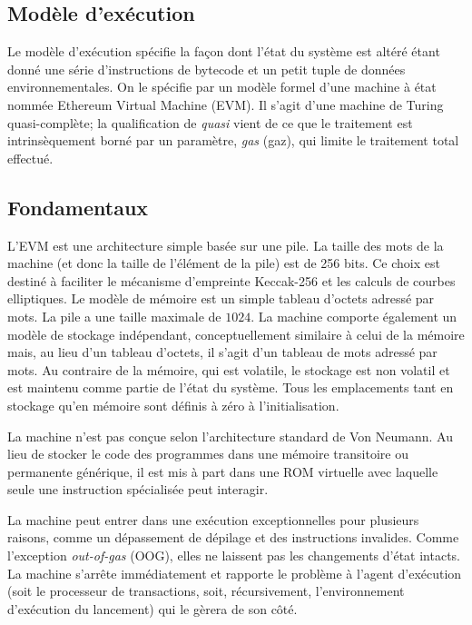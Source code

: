\documentclass[9pt,oneside]{amsart}
\begin{document}
\begin{multicols}{2}
\section{Modèle d'exécution} \label{ch:model}

Le modèle d'exécution spécifie la façon dont l'état du système est altéré étant donné une série d'instructions de bytecode et un petit tuple de données environnementales. On le spécifie par un modèle formel d'une machine à état nommée Ethereum Virtual Machine (EVM). Il s'agit d'une machine de Turing quasi-complète; la qualification de \textit{quasi} vient de ce que le traitement est intrinsèquement borné par un paramètre, \textit{gas} (gaz), qui limite le traitement total effectué.

\subsection{Fondamentaux}

L'EVM est une architecture simple basée sur une pile. La taille des mots de la machine (et donc la taille de l'élément de la pile) est de 256 bits. Ce choix est destiné à faciliter le mécanisme d'empreinte Keccak-256 et les calculs de courbes elliptiques. Le modèle de mémoire est un simple tableau d'octets adressé par mots. La pile a une taille maximale de $1024$. La machine comporte également un modèle de stockage indépendant, conceptuellement similaire à celui de la mémoire mais, au lieu d'un tableau d'octets, il s'agit d'un tableau de mots adressé par mots. Au contraire de la mémoire, qui est volatile, le stockage est non volatil et est maintenu comme partie de l'état du système. Tous les emplacements tant en stockage qu'en mémoire sont définis à zéro à l'initialisation.

La machine n'est pas conçue selon l'architecture standard de Von Neumann. Au lieu de stocker le code des programmes dans une mémoire transitoire ou permanente générique, il est mis à part dans une ROM virtuelle avec laquelle seule une instruction spécialisée peut interagir.

La machine peut entrer dans une exécution exceptionnelles pour plusieurs raisons, comme un dépassement de dépilage et des instructions invalides. Comme l'exception \textit{out-of-gas} (OOG), elles ne laissent pas les changements d'état intacts. La machine s'arrête immédiatement et rapporte le problème à l'agent d'exécution (soit le processeur de transactions, soit, récursivement, l'environnement d'exécution du lancement) qui le gèrera de son côté.


\end{multicols}
\end{document}
